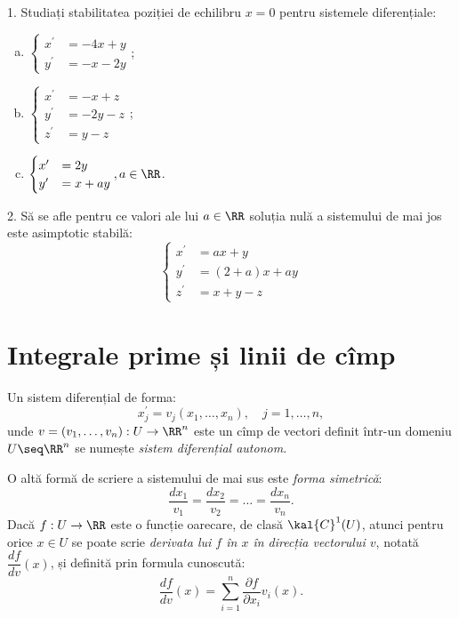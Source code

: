 1. Studiați stabilitatea poziției de echilibru $ x = 0 $ pentru sistemele
diferențiale:
\begin{enumerate}[(a)]
\item $ \begin{cases}
    x^\prime &= -4x + y \\
    y^\prime &= -x - 2y
  \end{cases} $;
\item $ \begin{cases}
    x^\prime &= -x + z \\
    y^\prime &= -2y - z \\
    z^\prime &= y - z
  \end{cases} $;
\item $ \begin{cases}
    x^\prime &= 2y \\
    y^\prime &= x + ay
  \end{cases}, a \in \RR $.
\end{enumerate}

\vspace{1cm}

2. Să se afle pentru ce valori ale lui $ a \in \RR $ soluția nulă a
sistemului de mai jos este asimptotic stabilă:
\[
  \begin{cases}
    x^\prime &= ax + y \\
    y^\prime &= (2 + a)x + ay \\
    z^\prime &= x + y - z
  \end{cases}
\]


\section{Integrale prime și linii de cîmp}

\begin{definition}\label{def:sist-autonom}
  Un sistem diferențial de forma:
  \[
    x^\prime_j = v_j(x_1, \dots, x_n), \quad j = 1, \dots, n,
  \]
  unde $ v = (v_1, \dots, v_n) : U \to \RR^n $ este un cîmp de vectori definit
  într-un domeniu $ U \seq \RR^n $ se numește \emph{sistem diferențial autonom}.
\end{definition}

O altă formă de scriere a sistemului de mai sus este \emph{forma simetrică}:
\[
  \dfrac{dx_1}{v_1} = \dfrac{dx_2}{v_2} = \dots = \dfrac{dx_n}{v_n}.
\]
Dacă $ f : U \to \RR $ este o funcție oarecare, de clasă $ \kal{C}^1(U) $, atunci
pentru orice $ x \in U $ se poate scrie \emph{derivata lui $ f $ în $ x $ %
  în direcția vectorului $ v $}, notată $ \dfrac{df}{dv}(x) $, și definită
prin formula cunoscută:
\[
  \dfrac{df}{dv}(x) = \sum_{i = 1}^n \dfrac{\partial f}{\partial x_i} v_i(x).
\]


